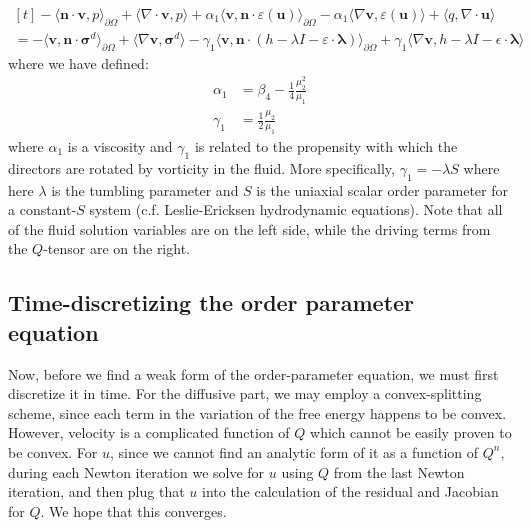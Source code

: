 \documentclass[reqno]{article}
\begin{document}
  \begin{equation}
    \begin{multlined}[t]
      -\langle \mathbf{n} \cdot \mathbf{v}, p \rangle_{\partial \Omega}
      + \langle \nabla \cdot \mathbf{v}, p \rangle
      + \alpha_1 \langle \mathbf{v}, \mathbf{n} \cdot \varepsilon(\mathbf{u}) \rangle_{\partial \Omega}
      - \alpha_1 \langle \nabla \mathbf{v}, \varepsilon(\mathbf{u}) \rangle 
      + \langle q, \nabla \cdot \mathbf{u} \rangle \\
      =
      - \langle \mathbf{v}, \mathbf{n} \cdot \boldsymbol\sigma^d \rangle_{\partial \Omega}
      + \langle \nabla \mathbf{v}, \boldsymbol\sigma^d \rangle
      - \gamma_1 \langle \mathbf{v}, \mathbf{n} \cdot (h - \lambda I - \varepsilon \cdot \mathbf{\lambda}) \rangle_{\partial \Omega}
      + \gamma_1 \langle \nabla\mathbf{v}, h - \lambda I - \epsilon \cdot \boldsymbol\lambda \rangle
    \end{multlined}
  \end{equation}
  where we have defined:
  \begin{align}
    \alpha_1 &= \beta_4 - \frac14 \frac{\mu_2^2}{\mu_1} \\
    \gamma_1 &= \frac12 \frac{\mu_2}{\mu_1}
  \end{align}
  where $\alpha_1$ is a viscosity and $\gamma_1$ is related to the propensity
  with which the directors are rotated by vorticity in the fluid.
  More specifically, $\gamma_1 = -\lambda S$ where here $\lambda$ is the
  tumbling parameter and $S$ is the uniaxial scalar order parameter for a
  constant-$S$ system (c.f. Leslie-Ericksen hydrodynamic equations).
  Note that all of the fluid solution variables are on the left side, while the
  driving terms from the $Q$-tensor are on the right.

  \subsection{Time-discretizing the order parameter equation}
  Now, before we find a weak form of the order-parameter equation, we must first
  discretize it in time.
  For the diffusive part, we may employ a convex-splitting scheme, since each
  term in the variation of the free energy happens to be convex.
  However, velocity is a complicated function of $Q$ which cannot be easily
  proven to be convex.
  For $u$, since we cannot find an analytic form of it as a function of $Q^n$,
  during each Newton iteration we solve for $u$ using $Q$ from the last Newton
  iteration, and then plug that $u$ into the calculation of the residual and
  Jacobian for $Q$.
  We hope that this converges.
\end{document}
